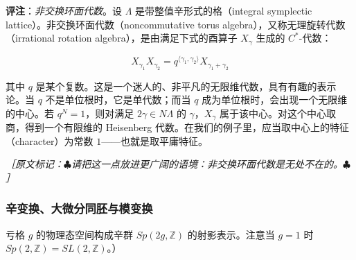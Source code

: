 
\medskip
\noindent\textbf{评注}：\emph{非交换环面代数}。设 $\Lambda$ 是带整值辛形式的格（integral symplectic lattice）。非交换环面代数（noncommutative torus algebra），又称无理旋转代数（irrational rotation algebra），是由满足下式的酉算子 $X_\gamma$ 生成的 $C^*$-代数：

\begin{equation}
  X_{\gamma_1}X_{\gamma_2}=q^{\langle\gamma_1,\gamma_2\rangle}X_{\gamma_1+\gamma_2}
  \tag{2.224}
  \label{eq:2.224}
\end{equation}

其中 $q$ 是某个复数。这是一个迷人的、非平凡的无限维代数，具有有趣的表示论。当 $q$ 不是单位根时，它是单代数；而当 $q$ 成为单位根时，会出现一个无限维的中心。若 $q^N=1$，则对满足 $2\gamma\in N\Lambda$ 的 $\gamma$，$X_\gamma$ 属于该中心。对这个中心取商，得到一个有限维的 Heisenberg 代数。在我们的例子里，应当取中心上的特征（character）为常数 $1$——也就是取平庸特征。

{\small\itshape ［原文标记：$\clubsuit$请把这一点放进更广阔的语境：非交换环面代数是无处不在的。$\clubsuit$］}

\subsubsection{辛变换、大微分同胚与模变换} %

亏格 $g$ 的物理态空间构成辛群 $Sp(2g,\mathbb{Z})$ 的射影表示。注意当 $g=1$ 时 $Sp(2,\mathbb{Z})=SL(2,\mathbb{Z})$。）

